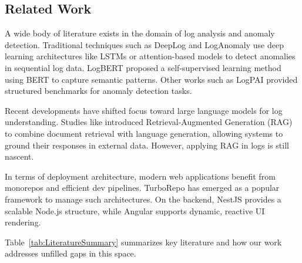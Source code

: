 \documentclass[conference]{IEEEtran}
\begin{document}
\subsection{Related Work}

A wide body of literature exists in the domain of log analysis and anomaly detection. Traditional techniques such as DeepLog \cite{du2020deeplog} and LogAnomaly \cite{he2021loganomaly} use deep learning architectures like LSTMs or attention-based models to detect anomalies in sequential log data. LogBERT \cite{xu2021logbert} proposed a self-supervised learning method using BERT to capture semantic patterns. Other works such as LogPAI \cite{he2016experience} provided structured benchmarks for anomaly detection tasks.

Recent developments have shifted focus toward large language models for log understanding. Studies like \cite{lewis2023ragqa} introduced Retrieval-Augmented Generation (RAG) to combine document retrieval with language generation, allowing systems to ground their responses in external data. However, applying RAG in logs is still nascent.

In terms of deployment architecture, modern web applications benefit from monorepos and efficient dev pipelines. TurboRepo \cite{turbo2023repo} has emerged as a popular framework to manage such architectures. On the backend, NestJS \cite{nestjs2022framework} provides a scalable Node.js structure, while Angular \cite{angular2022framework} supports dynamic, reactive UI rendering.

Table~\ref{tab:LiteratureSummary} summarizes key literature and how our work addresses unfilled gaps in this space.
\end{document}
